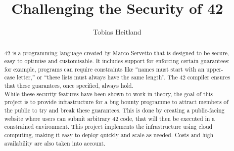 \documentclass[11pt
              , a4paper
              , twoside
              , openright
              ]{report}
\title{Challenging the Security of 42}
\author{Tobias Heitland}
\date{}
\begin{document}
\frontmatter



\begin{abstract}

42 is a programming language created by Marco Servetto that is designed to be secure, easy to optimise and customisable. It includes support for enforcing certain guarantees: for example, programs can require constraints like “names must start with an upper-case letter,” or “these lists must always have the same length”. The 42 compiler ensures that these guarantees, once specified, always hold.
\\[12pt]
While these security features have been shown to work in theory, the goal of this project is to provide infrastructure for a bug bounty programme to attract members of the public to try and break these guarantees. This is done by creating a public-facing website where users can submit arbitrary 42 code, that will then be executed in a constrained environment. This project implements the infrastructure using cloud computing, making it easy to deploy quickly and scale as needed. Costs and high availability are also taken into account.

\end{abstract}


\maketitle



\tableofcontents



\mainmatter


%
%
%
%




\backmatter



%


\end{document}

